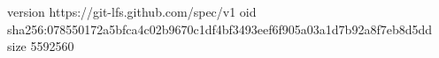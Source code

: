version https://git-lfs.github.com/spec/v1
oid sha256:078550172a5bfca4c02b9670c1df4bf3493eef6f905a03a1d7b92a8f7eb8d5dd
size 5592560
